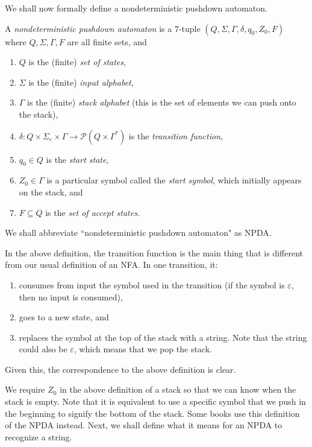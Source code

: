 \vspace{3mm}
We shall now formally define a nondeterministic pushdown automaton.
\begin{fdef}
A \textit{nondeterministic pushdown automaton} is a $7$-tuple $(Q,\Sigma,\Gamma,\delta,q_0,Z_0,F)$ where $Q,\Sigma, \Gamma, F$ are all finite sets, and
\begin{enumerate}
    \item $Q$ is the (finite) \textit{set of states},
    \item $\Sigma$ is the (finite) \textit{input alphabet},
    \item $\Gamma$ is the (finite) \textit{stack alphabet} (this is the set of elements we can push onto the stack),
    \item $\delta:Q\times\Sigma_\varepsilon\times\Gamma\to\mathcal{P}(Q\times\Gamma^*)$ is the \textit{transition function},
    \item $q_0\in Q$ is the \textit{start state},
    \item $Z_0\in\Gamma$ is a particular symbol called the \textit{start symbol}, which initially appears on the stack, and
    \item $F\subseteq Q$ is the \textit{set of accept states}.
\end{enumerate}
\end{fdef}

\vspace{2mm}
We shall abbreviate ``nondeterministic pushdown automaton" as NPDA.

In the above definition, the transition function is the main thing that is different from our usual definition of an NFA. In one transition, it:
\begin{enumerate}
    \item consumes from input the symbol used in the transition (if the symbol is $\varepsilon$, then no input is consumed),
    \item goes to a new state, and
    \item replaces the symbol at the top of the stack with a string. Note that the string could also be $\varepsilon$, which means that we pop the stack.
\end{enumerate}
Given this, the correspondence to the above definition is clear.

We require $Z_0$ in the above definition of a stack so that we can know when the stack is empty. Note that it is equivalent to use a specific symbol that we push in the beginning to signify the bottom of the stack. Some books use this definition of the NPDA instead. Next, we shall define what it means for an NPDA to recognize a string.

